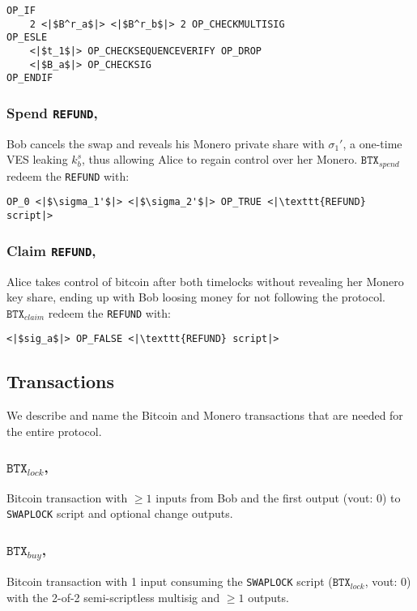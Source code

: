 \documentclass{llncs}
\newcommand{\BTX}{\texttt{BTX}}
\begin{document}
\begin{verbatim}
OP_IF
    2 <|$B^r_a$|> <|$B^r_b$|> 2 OP_CHECKMULTISIG
OP_ESLE
    <|$t_1$|> OP_CHECKSEQUENCEVERIFY OP_DROP
    <|$B_a$|> OP_CHECKSIG
OP_ENDIF
\end{verbatim}

\subsubsection{Spend \texttt{REFUND},}
Bob cancels the swap and reveals his Monero private share with $\sigma_1'$, a one-time VES leaking $k^s_b$, thus allowing Alice to regain control over her Monero. $\BTX_\textit{spend}$ redeem the \texttt{REFUND} with:

\begin{verbatim}
OP_0 <|$\sigma_1'$|> <|$\sigma_2'$|> OP_TRUE <|\texttt{REFUND} script|>
\end{verbatim}

\subsubsection{Claim \texttt{REFUND},}
Alice takes control of bitcoin after both timelocks without revealing her Monero key share, ending up with Bob loosing money for not following the protocol. $\BTX_\textit{claim}$ redeem the \texttt{REFUND} with:

\begin{verbatim}
<|$sig_a$|> OP_FALSE <|\texttt{REFUND} script|>
\end{verbatim}

\subsection{Transactions}
We describe and name the Bitcoin and Monero transactions that are needed for the entire protocol.

\subsubsection{$\BTX_\textit{lock}$,}
Bitcoin transaction with $\geq 1$ inputs from Bob and the first output (vout: 0) to \texttt{SWAPLOCK} script and optional change outputs.

\subsubsection{$\BTX_\textit{buy}$,}
Bitcoin transaction with 1 input consuming the \texttt{SWAPLOCK} script ($\BTX_\textit{lock}$, vout: 0) with the 2-of-2 semi-scriptless multisig and $\geq 1$ outputs.
\end{document}
